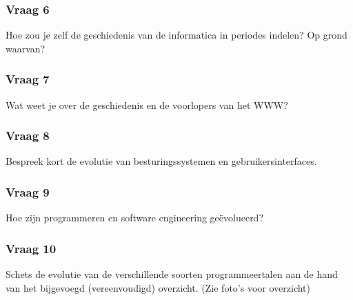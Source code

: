 \documentclass[../main.tex]{subfiles}
\begin{document}
\subsubsection{Vraag 6}
\begin{question}
Hoe zou je zelf de geschiedenis van de informatica in periodes indelen? Op grond waarvan?
\end{question}

\subsubsection{Vraag 7}
\begin{question}
Wat weet je over de geschiedenis en de voorlopers van het WWW?
\end{question}

\subsubsection{Vraag 8}
\begin{question}
Bespreek kort de evolutie van besturingssystemen en gebruikersinterfaces.
\end{question}

\subsubsection{Vraag 9}
\begin{question}
Hoe zijn programmeren en software engineering geëvolueerd?
\end{question}

\subsubsection{Vraag 10}
\begin{question}
Schets de evolutie van de verschillende soorten programmeertalen aan de hand van het bijgevoegd (vereenvoudigd) overzicht. (Zie foto's voor overzicht)
\end{question}
\end{document}

